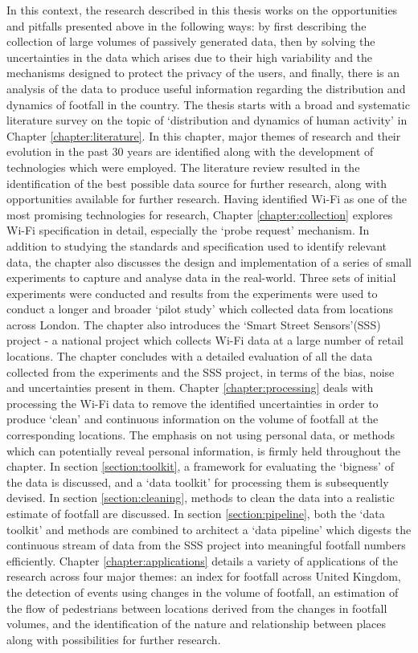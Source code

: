 In this context, the research described in this thesis works on the opportunities and pitfalls presented above in the following ways: by first describing the collection of large volumes of passively generated data, then by solving the uncertainties in the data which arises due to their high variability and the mechanisms designed to protect the privacy of the users, and finally, there is an analysis of the data to produce useful information regarding the distribution and dynamics of footfall in the country.
The thesis starts with a broad and systematic literature survey on the topic of `distribution and dynamics of human activity' in Chapter \ref{chapter:literature}.
In this chapter, major themes of research and their evolution in the past 30 years are identified along with the development of technologies which were employed.
The literature review resulted in the identification of the best possible data source for further research, along with opportunities available for further research.
Having identified Wi-Fi as one of the most promising technologies for research, Chapter \ref{chapter:collection} explores Wi-Fi specification in detail, especially the `probe request' mechanism.
In addition to studying the standards and specification used to identify relevant data, the chapter also discusses the design and implementation of a series of small experiments to capture and analyse data in the real-world.
Three sets of initial experiments were conducted and results from the experiments were used to conduct a longer and broader `pilot study' which collected data from locations across London.
The chapter also introduces the `Smart Street Sensors'(SSS) project - a national project which collects Wi-Fi data at a large number of retail locations.
The chapter concludes with a detailed evaluation of all the data collected from the experiments and the SSS project, in terms of the bias, noise and uncertainties present in them.
Chapter \ref{chapter:processing} deals with processing the Wi-Fi data to remove the identified uncertainties in order to produce `clean' and continuous information on the volume of footfall at the corresponding locations.
The emphasis on not using personal data, or methods which can potentially reveal personal information, is firmly held throughout the chapter.
In section \ref{section:toolkit}, a framework for evaluating the `bigness' of the data is discussed, and a `data toolkit' for processing them is subsequently devised.
In section \ref{section:cleaning}, methods to clean the data into a realistic estimate of footfall are discussed.
In section \ref{section:pipeline}, both the `data toolkit' and methods are combined to architect a `data pipeline' which digests the continuous stream of data from the SSS project into meaningful footfall numbers efficiently.
Chapter \ref{chapter:applications} details a variety of applications of the research across four major themes: an index for footfall across United Kingdom, the detection of events using changes in the volume of footfall, an estimation of the flow of pedestrians between locations derived from the changes in footfall volumes, and the identification of the nature and relationship between places along with possibilities for further research.

